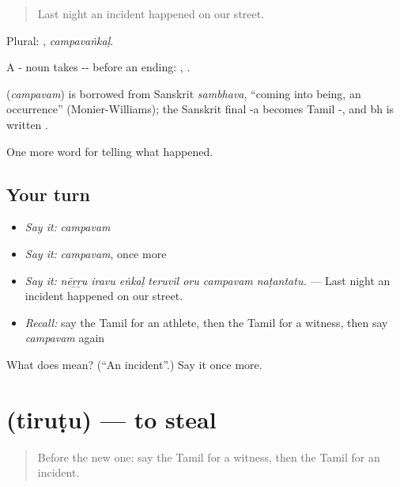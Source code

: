 \begin{quote}
Last night an incident happened on our street.
\end{quote}

Plural: , \emph{campavaṅkaḷ}.

A - noun takes -- before an ending: , .

\begin{cousinweb}
\textbf{} (\emph{campavam}) is borrowed from Sanskrit \emph{sambhava}, \textquotedblleft{}coming into being, an occurrence\textquotedblright{} (Monier-Williams); the Sanskrit final -a becomes Tamil -, and bh is written .
\end{cousinweb}

\begin{grammarlens}[title={What you've built}]
One more word for telling what happened.
\end{grammarlens}

\subsection*{Your turn}
\begin{itemize}
\raggedright
  \item \emph{Say it:} \emph{campavam}
  \item \emph{Say it:} \emph{campavam}, once more
  \item \emph{Say it:} \emph{nēṟṟu iravu eṅkaḷ teruvil oru campavam naṭantatu.} — Last night an incident happened on our street.
  \item \emph{Recall:} say the Tamil for an athlete, then the Tamil for a witness, then say \emph{campavam} again
\end{itemize}

\begin{tcolorbox}[breakable,colback=teal!4,colframe=teal!35!black,title={Before you move on}]
What does  mean? (\textquotedblleft{}An incident\textquotedblright{}.) Say it once more.
\end{tcolorbox}
\section[\texorpdfstring{\ta{திருடு} (tiruṭu)}{திருடு (tiruṭu)}]{ (tiruṭu) — to steal}

\label{lesson:TA-C294-tirutu}



\begin{quote}
Before the new one: say the Tamil for a witness, then the Tamil for an incident.
\end{quote}

